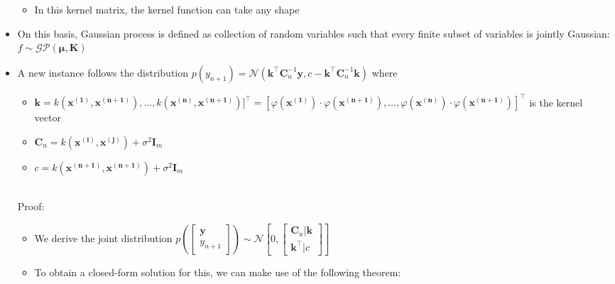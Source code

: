 \begin{itemize}
\begin{itemize}
        \item In this kernel matrix, the kernel function can take any shape
    \end{itemize}
    \item On this basis, Gaussian process is defined as collection of random variables such that every finite subset of variables is jointly Gaussian: $f \sim \mathcal{GP}( \boldsymbol{\mu}, \boldsymbol{K})$
    \item A new instance follows the distribution $p(y_{n+1}) = \mathcal{N} ( \boldsymbol{k}^\intercal \boldsymbol{C}_n^{-1} \boldsymbol{y}, c - \boldsymbol{k}^\intercal \boldsymbol{C}_n^{-1} \boldsymbol{k} )$ where 
    \begin{itemize}
        \item $\boldsymbol{k} = k(\boldsymbol{x^{(1)}}, \boldsymbol{x^{(n+1)}}), ..., k(\boldsymbol{x^{(n)}}, \boldsymbol{x^{(n+1)}}) ]^\intercal = [ \varphi(\boldsymbol{x^{(1)}}) \cdot \varphi(\boldsymbol{x^{(n+1)}}), ..., \varphi(\boldsymbol{x^{(n)}}) \cdot \varphi(\boldsymbol{x^{(n+1)}}) ]^\intercal$ is the kernel vector
        \item $\boldsymbol{C}_n = k(\boldsymbol{x^{(i)}},\boldsymbol{x^{(j)}}) + \sigma^2 \boldsymbol{I}_m$
        \item $c = k(\boldsymbol{x^{(n+1)}},\boldsymbol{x^{(n+1)}}) + \sigma^2 \boldsymbol{I}_m$
    \end{itemize}\\
    Proof:
    \begin{itemize}
        \item We derive the joint distribution $p(
        \begin{bmatrix}
        \boldsymbol{y} \\
        y_{n+1}
        \end{bmatrix} 
        ) \sim \mathcal{N} [0, 
        \begin{bmatrix}
        \boldsymbol{C}_n | \boldsymbol{k} \\
        \boldsymbol{k}^\intercal | c
        \end{bmatrix} 
        ]$
        \item To obtain a closed-form solution for this, we can make use of the following theorem:
\end{itemize}
\end{itemize}
